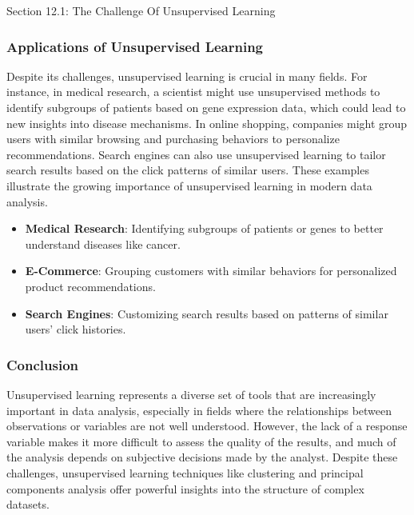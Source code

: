 \begin{notes}{Section 12.1: The Challenge Of Unsupervised Learning}
    \subsubsection*{Applications of Unsupervised Learning}
    
    Despite its challenges, unsupervised learning is crucial in many fields. For instance, in medical research, a scientist might use unsupervised methods to identify subgroups of patients based on gene expression 
    data, which could lead to new insights into disease mechanisms. In online shopping, companies might group users with similar browsing and purchasing behaviors to personalize recommendations. Search engines 
    can also use unsupervised learning to tailor search results based on the click patterns of similar users. These examples illustrate the growing importance of unsupervised learning in modern data analysis.
    
    \begin{highlight}
        \begin{itemize}
            \item \textbf{Medical Research}: Identifying subgroups of patients or genes to better understand diseases like cancer.
            \item \textbf{E-Commerce}: Grouping customers with similar behaviors for personalized product recommendations.
            \item \textbf{Search Engines}: Customizing search results based on patterns of similar users’ click histories.
        \end{itemize}
    \end{highlight}
    
    \subsubsection*{Conclusion}
    
    Unsupervised learning represents a diverse set of tools that are increasingly important in data analysis, especially in fields where the relationships between observations or variables are not well understood. 
    However, the lack of a response variable makes it more difficult to assess the quality of the results, and much of the analysis depends on subjective decisions made by the analyst. Despite these challenges, 
    unsupervised learning techniques like clustering and principal components analysis offer powerful insights into the structure of complex datasets.
    

\end{notes}
